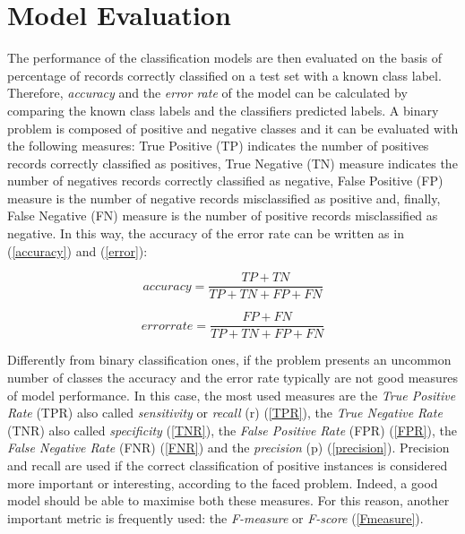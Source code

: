 \documentclass[final,a4paper,12pt,english]{UnicaPhdThesis3}
\begin{document}
	\section{Model Evaluation} \label{ME} %
	The performance of the classification models are then evaluated on the basis of percentage of records correctly classified on a test set with a known class label. Therefore, \textit{accuracy} and the \textit{error rate} of the model can be calculated by comparing the known class labels and the classifiers predicted labels. A binary problem is composed of positive and negative classes and it can be evaluated with the following measures: True Positive (\acs{TP}) indicates the number of positives records correctly classified as positives, True Negative (\acs{TN}) measure indicates the number of negatives records correctly classified as negative, False Positive (\acs{FP}) measure is the number of negative records misclassified as positive and, finally, False Negative (\acs{FN}) measure is the number of positive records misclassified as negative. In this way, the accuracy of the error rate can be written as in (\ref{accuracy}) and (\ref{error}):
	
	\begin{equation}\label{accuracy}
	accuracy= \frac{TP + TN}{TP + TN + FP + FN}	
	\end{equation}
	
	\begin{equation}\label{error}
	error rate= \frac{FP + FN}{TP + TN + FP + FN}	
	\end{equation}
	
	Differently from binary classification ones, if the problem presents an uncommon number of classes the accuracy and the error rate typically are not good measures of model performance. In this case, the most used measures are the \textit{True Positive Rate} (\acs{TPR}) also called \textit{sensitivity} or \textit{recall} (r) (\ref{TPR}), the \textit{True Negative Rate} (\acs{TNR}) also called \textit{specificity} (\ref{TNR}), the \textit{False Positive Rate} (\acs{FPR}) (\ref{FPR}), the \textit{False Negative Rate} (\acs{FNR}) (\ref{FNR}) and the \textit{precision} (p) (\ref{precision}). Precision and recall are used if the correct classification of positive instances is considered more important or interesting, according to the faced problem. Indeed, a good model should be able to maximise both these measures. For this reason, another important metric is frequently used: the \textit{F-measure} or \textit{F-score} (\ref{Fmeasure}).
	
\end{document}
